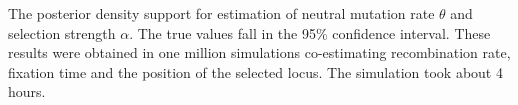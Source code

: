 \documentclass[portrait,final]{baposter}
\begin{document}
\begin{poster}
{

\vspace{0.5em}

The posterior density support for estimation of neutral mutation rate $\theta$
and selection strength $\alpha$. The true values fall in the 95\% confidence
interval. These results were obtained in one million simulations co-estimating
recombination rate, fixation time and the position of the selected locus. The
simulation took about 4 hours.

\vspace{1em}

}
\end{poster}
\end{document}
